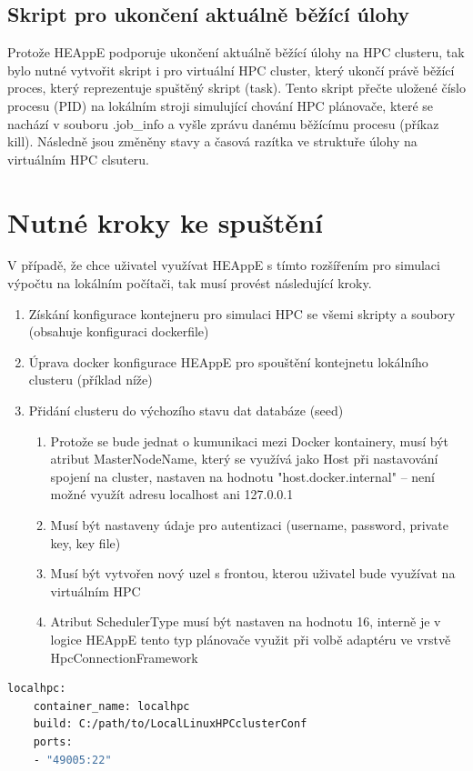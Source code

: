 \subsection{Skript pro ukončení aktuálně běžící úlohy}
Protože HEAppE podporuje ukončení aktuálně běžící úlohy na HPC clusteru, tak bylo nutné vytvořit skript i pro virtuální HPC cluster, který ukončí právě běžící proces, který reprezentuje spuštěný skript (task). Tento skript přečte uložené číslo procesu (PID) na lokálním stroji simulující chování HPC plánovače, které se nachází v souboru .job\_info a vyšle zprávu danému běžícímu procesu (příkaz kill). Následně jsou změněny stavy a časová razítka ve struktuře úlohy na virtuálním HPC clsuteru.

\section{Nutné kroky ke spuštění}
V případě, že chce uživatel využívat HEAppE s tímto rozšířením pro simulaci výpočtu na lokálním počítači, tak musí provést následující kroky.

\begin{enumerate}
	\item Získání konfigurace kontejneru pro simulaci HPC se všemi skripty a soubory (obsahuje konfiguraci dockerfile)
	\item Úprava docker konfigurace HEAppE pro spouštění kontejnetu lokálního clusteru (příklad níže)
	\item Přidání clusteru do výchozího stavu dat databáze (seed)
	\begin{enumerate}
	    \item Protože se bude jednat o kumunikaci mezi Docker kontainery, musí být atribut MasterNodeName, který se využívá jako Host při nastavování spojení na cluster, nastaven na hodnotu "host.docker.internal" – není možné využít adresu localhost ani 127.0.0.1
	    \item Musí být nastaveny údaje pro autentizaci (username, password, private key, key file)
	    \item Musí být vytvořen nový uzel s frontou, kterou uživatel bude využívat na virtuálním HPC
	    \item Atribut SchedulerType musí být nastaven na hodnotu 16, interně je v logice HEAppE tento typ plánovače využit při volbě adaptéru ve vrstvě HpcConnectionFramework
	\end{enumerate}
\end{enumerate}

\begin{lstlisting}[language=Dockerfile,caption={Docker konfigurace pro spouštění kontejnetu lokálního clusteru}]
localhpc:
    container_name: localhpc
    build: C:/path/to/LocalLinuxHPCclusterConf
    ports:
    - "49005:22"
\end{lstlisting}


